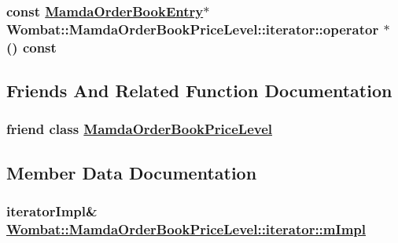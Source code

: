 \hypertarget{classWombat_1_1MamdaOrderBookPriceLevel_1_1iterator_1e385f3351dfdec925b4f205280dc9e0}{
\subsubsection[operator $\ast$]{\setlength{\rightskip}{0pt plus 5cm}const \hyperlink{classWombat_1_1MamdaOrderBookEntry}{Mamda\-Order\-Book\-Entry}$\ast$ Wombat::Mamda\-Order\-Book\-Price\-Level::iterator::operator $\ast$ () const}}
\label{classWombat_1_1MamdaOrderBookPriceLevel_1_1iterator_1e385f3351dfdec925b4f205280dc9e0}




\subsection{Friends And Related Function Documentation}
\hypertarget{classWombat_1_1MamdaOrderBookPriceLevel_1_1iterator_83befa395a3c1e3740504a3c62bd8234}{
\subsubsection[MamdaOrderBookPriceLevel]{\setlength{\rightskip}{0pt plus 5cm}friend class \hyperlink{classWombat_1_1MamdaOrderBookPriceLevel}{Mamda\-Order\-Book\-Price\-Level}}}
\label{classWombat_1_1MamdaOrderBookPriceLevel_1_1iterator_83befa395a3c1e3740504a3c62bd8234}




\subsection{Member Data Documentation}
\hypertarget{classWombat_1_1MamdaOrderBookPriceLevel_1_1iterator_612cc7a8597085dd45cd400c080ee3a4}{
\subsubsection[mImpl]{\setlength{\rightskip}{0pt plus 5cm}iterator\-Impl\& \hyperlink{classWombat_1_1MamdaOrderBookPriceLevel_1_1iterator_612cc7a8597085dd45cd400c080ee3a4}{Wombat::Mamda\-Order\-Book\-Price\-Level::iterator::m\-Impl}}}
\label{classWombat_1_1MamdaOrderBookPriceLevel_1_1iterator_612cc7a8597085dd45cd400c080ee3a4}


